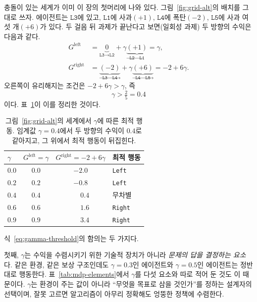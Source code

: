 \documentclass[11pt,a4paper]{article}
\begin{document}
충돌이 있는 세계가 이미 이 장의 첫머리에 나와 있다. 그림~\ref{fig:grid-alt}의 배치를 그대로 쓰자.
에이전트는 $\texttt{L3}$에 있고, $\texttt{L1}$에 사과$(+1)$, $\texttt{L4}$에 폭탄$(-2)$,
$\texttt{L5}$에 사과 여섯 개$(+6)$가 있다. 두 걸음 뒤 과제가 끝난다고 보면(일회성 과제) 두 방향의
수익은 다음과 같다.
\begin{align}
  G^{\text{left}}  &= \underbrace{0}_{\texttt{L3}\to\texttt{L2}} + \gamma\underbrace{(+1)}_{\texttt{L2}\to\texttt{L1}} = \gamma, \\
  G^{\text{right}} &= \underbrace{(-2)}_{\texttt{L3}\to\texttt{L4}} + \gamma\underbrace{(+6)}_{\texttt{L4}\to\texttt{L5}} = -2 + 6\gamma.
\end{align}
오른쪽이 유리해지는 조건은 $-2+6\gamma > \gamma$, 즉
\begin{equation}
  \boxed{\;\gamma > \tfrac{2}{5} = 0.4\;}
  \label{eq:gamma-threshold}
\end{equation}
이다. 표~\ref{tab:gamma-flip}이 이를 정리한 것이다.

\begin{table}[htbp]
\centering
\caption{그림~\ref{fig:grid-alt}의 세계에서 $\gamma$에 따른 최적 행동. 임계값
$\gamma=0.4$에서 두 방향의 수익이 $0.4$로 같아지고, 그 위에서 최적 행동이 뒤집힌다.}
\label{tab:gamma-flip}
\small
\begin{tabular}{@{}lccl@{}}
\toprule
$\gamma$ & $G^{\text{left}}=\gamma$ & $G^{\text{right}}=-2+6\gamma$ & 최적 행동 \\
\midrule
$0.0$ & $0.0$ & $-2.0$ & \texttt{Left} \\
$0.2$ & $0.2$ & $-0.8$ & \texttt{Left} \\
$0.4$ & $0.4$ & $\phantom{-}0.4$ & 무차별 \\
$0.6$ & $0.6$ & $\phantom{-}1.6$ & \texttt{Right} \\
$0.9$ & $0.9$ & $\phantom{-}3.4$ & \texttt{Right} \\
\bottomrule
\end{tabular}
\end{table}

식~\eqref{eq:gamma-threshold}의 함의는 두 가지다.

첫째, $\gamma$는 수익을 수렴시키기 위한 기술적 장치가 아니라 \emph{문제의 답을 결정하는 요소}다.
같은 환경, 같은 보상 구조인데도 $\gamma=0.3$인 에이전트와 $\gamma=0.5$인 에이전트는 정반대로 행동한다.
표~\ref{tab:mdp-elements}에서 $\gamma$를 다섯 요소와 따로 적어 둔 것도 이 때문이다. $\gamma$는 환경이
주는 값이 아니라 ``무엇을 목표로 삼을 것인가''를 정하는 설계자의 선택이며, 잘못 고르면 알고리즘이
아무리 정확해도 엉뚱한 정책에 수렴한다.
\end{document}

